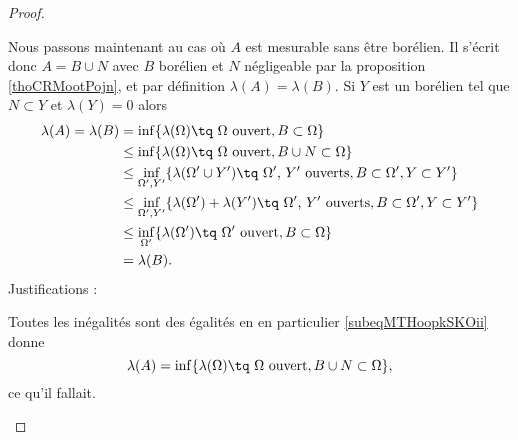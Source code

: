 \begin{proof}
\begin{subproof}
    Nous passons maintenant au cas où \( A \) est mesurable sans être borélien. Il s'écrit donc \( A=B\cup N\) avec \( B\) borélien et \( N\) négligeable par la proposition \ref{thoCRMootPojn}, et par définition \( \lambda(A)=\lambda(B)\). Si \( Y\) est un borélien tel que \( N\subset Y\) et \( \lambda(Y)=0\) alors
    \begin{subequations}
        \begin{align}
            \lambda(A)=\lambda(B)&=\inf\{ \lambda(\Omega)\tq \text{ \( \Omega\) ouvert}, B\subset\Omega \}\label{subeqMTHoopkSKOi}\\
            &\leq\inf\{ \lambda(\Omega)\tq \text{ \( \Omega\) ouvert}, B\cup N\subset\Omega \}  \label{subeqMTHoopkSKOii}\\
            &\leq\inf_{\Omega',Y'}\{ \lambda(\Omega'\cup Y')\tq \text{ \( \Omega'\), \( Y'\) ouverts}, B\subset\Omega', Y\subset Y' \}\label{subeqMTHoopkSKOiii}\\
            &\leq\inf_{\Omega',Y'}\{ \lambda(\Omega')+\lambda(Y')\tq \text{ \( \Omega'\), \( Y'\) ouverts},  B\subset\Omega',Y\subset Y' \}\label{subeqMTHoopkSKOiv}\\
            &\leq\inf_{\Omega'}\{ \lambda(\Omega')\tq \text{ \( \Omega'\) ouvert},  B\subset\Omega \}\label{subeqMTHoopkSKOv}\\
            &=\lambda(B).
        \end{align}
    \end{subequations}
    Justifications :
    Toutes les inégalités sont des égalités en en particulier \eqref{subeqMTHoopkSKOii} donne
    \begin{equation}
        \lambda(A)=\inf\{ \lambda(\Omega)\tq \text{ \( \Omega\) ouvert}, B\cup N\subset\Omega \},
    \end{equation}
    ce qu'il fallait.
    \end{subproof}
    

\end{proof}
